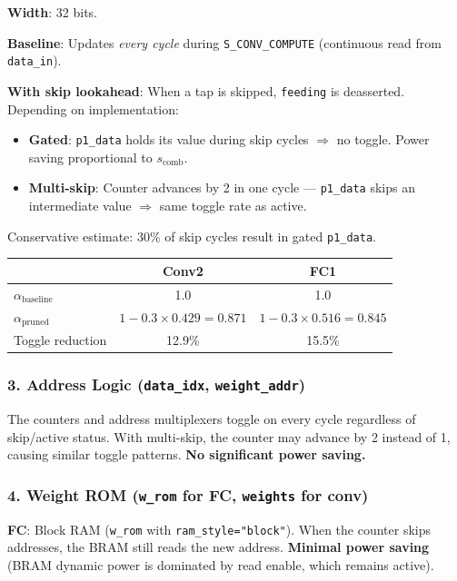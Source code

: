 \documentclass[11pt,a4paper]{article}
\begin{document}
\noindent\textbf{Width}: 32 bits.

\noindent\textbf{Baseline}: Updates \emph{every cycle} during \texttt{S\_CONV\_COMPUTE}
(continuous read from \texttt{data\_in}).

\noindent\textbf{With skip lookahead}: When a tap is skipped, \texttt{feeding} is
deasserted.  Depending on implementation:
\begin{itemize}[nosep]
    \item \textbf{Gated}: \texttt{p1\_data} holds its value during skip cycles
        $\Rightarrow$ no toggle. Power saving proportional to $s_{\text{comb}}$.
    \item \textbf{Multi-skip}: Counter advances by 2 in one cycle — \texttt{p1\_data}
        skips an intermediate value $\Rightarrow$ same toggle rate as active.
\end{itemize}

Conservative estimate: 30\% of skip cycles result in gated \texttt{p1\_data}.

\begin{center}
\begin{tabular}{lcc}
\toprule
& Conv2 & FC1 \\
\midrule
$\alpha_{\text{baseline}}$ & 1.0 & 1.0 \\
$\alpha_{\text{pruned}}$   & $1 - 0.3 \times 0.429 = 0.871$ & $1 - 0.3 \times 0.516 = 0.845$ \\
Toggle reduction            & 12.9\% & 15.5\% \\
\bottomrule
\end{tabular}
\end{center}

\subsubsection{3. Address Logic (\texttt{data\_idx}, \texttt{weight\_addr})}

The counters and address multiplexers toggle on every cycle regardless of
skip/active status.  With multi-skip, the counter may advance by 2 instead
of 1, causing similar toggle patterns.  \textbf{No significant power saving.}

\subsubsection{4. Weight ROM (\texttt{w\_rom} for FC, \texttt{weights} for conv)}

\noindent\textbf{FC}: Block RAM (\texttt{w\_rom} with \texttt{ram\_style="block"}).
When the counter skips addresses, the BRAM still reads the new address.
\textbf{Minimal power saving} (BRAM dynamic power is dominated by read enable,
which remains active).
\end{document}
